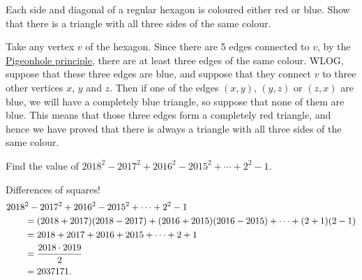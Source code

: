\begin{question}
    Each side and diagonal of a regular hexagon is coloured either red or blue.
    Show that there is a triangle with all three sides of the same colour. 
\end{question}
\begin{solution}
    Take any vertex $v$ of the hexagon. Since there are 5 edges connected to
    $v$, by the \hyperref[thm: pigeonhole]{Pigeonhole principle}, there are at
    least three edges of the same colour. WLOG, suppose that these three edges
    are blue, and suppose that they connect $v$ to three other vertices $x$,
    $y$ and $z$. Then if one of the edges $(x, y)$, $(y, z)$ or $(z, x)$ are
    blue, we will have a completely blue triangle, so suppose that none of them
    are blue. This means that those three edges form a completely red triangle,
    and hence we have proved that there is always a triangle with all three
    sides of the same colour.
\end{solution}

\begin{question}
    Find the value of $2018^2 - 2017^2 + 2016^2 - 2015^2 + \cdots + 2^2 - 1$.
\end{question}
\begin{solution} 
    Differences of squares!
    \begin{align*}
        \MoveEqLeft
    2018^2 - 2017^2 + 2016^2 - 2015^2 + \cdots + 2^2 - 1\\
        &= (2018 + 2017)(2018 - 2017) + (2016 + 2015)(2016 - 2015) + \cdots + (2 + 1)(2 - 1)\\
        &= 2018 + 2017 + 2016 + 2015 + \cdots + 2 + 1\\
        &= \frac{2018 \cdot 2019}{2}\\
        &= 2037171.
    \end{align*}
\end{solution}
